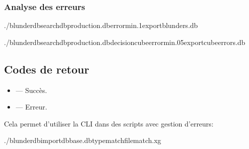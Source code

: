 \documentclass[letterpaper,10pt,french]{sphinxmanual}
\begin{document}
\subsubsection{Analyse des erreurs}
\label{\detokenize{cli:analyse-des-erreurs}}
\begin{sphinxVerbatim}[commandchars=\\\{\}]
./blunderdbsearch\PYGZhy{}\PYGZhy{}dbproduction.db\PYGZhy{}\PYGZhy{}error\PYGZhy{}min.1\PYGZhy{}\PYGZhy{}exportblunders.db

./blunderdbsearch\PYGZhy{}\PYGZhy{}dbproduction.db\PYGZhy{}\PYGZhy{}decisioncube\PYGZhy{}\PYGZhy{}error\PYGZhy{}min.05\PYGZhy{}\PYGZhy{}exportcube\PYGZus{}errors.db
\end{sphinxVerbatim}


\subsection{Codes de retour}
\label{\detokenize{cli:codes-de-retour}}\begin{itemize}
\item {} 
\sphinxAtStartPar
{} — Succès.

\item {} 
\sphinxAtStartPar
{} — Erreur.

\end{itemize}

\sphinxAtStartPar
Cela permet d’utiliser la CLI dans des scripts avec gestion d’erreurs:

\begin{sphinxVerbatim}[commandchars=\\\{\}]
./blunderdbimport\PYGZhy{}\PYGZhy{}dbbase.db\PYGZhy{}\PYGZhy{}typematch\PYGZhy{}\PYGZhy{}filematch.xg
\end{sphinxVerbatim}
\end{document}
